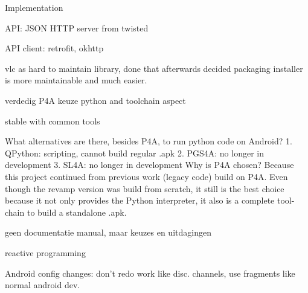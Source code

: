 Implementation

API: JSON HTTP server from twisted

API client: retrofit, okhttp


vlc as hard to maintain library, done that
afterwards decided packaging installer is more maintainable and much easier.




verdedig P4A keuze
python and toolchain aspect

stable with common tools

What alternatives are there, besides P4A, to run python code on Android?
1. QPython: scripting, cannot build regular .apk
2. PGS4A: no longer in development
3. SL4A: no longer in development
Why is P4A chosen?
Because this project continued from previous work (legacy code) build on P4A.
Even though the revamp version was build from scratch, it still is the best choice because it not only provides the Python interpreter, it also is a complete tool-chain to build a standalone .apk.



geen documentatie manual, maar keuzes en uitdagingen

reactive programming



Android config changes: don't redo work like disc. channels, use fragments like normal android dev.

